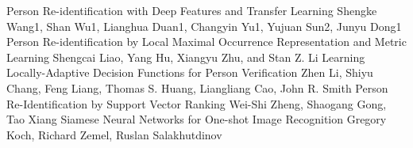 \documentclass{article}[12pt,a4paper]
\begin{document}
\newpage
\begin{thebibliography}{1}
    
 Person Re-identification with Deep Features and Transfer Learning
Shengke Wang1, Shan Wu1, Lianghua Duan1, Changyin Yu1, Yujuan Sun2, Junyu Dong1
 Person Re-identification by Local Maximal Occurrence
Representation and Metric Learning
Shengcai Liao, Yang Hu, Xiangyu Zhu, and Stan Z. Li
 Learning Locally-Adaptive Decision Functions for Person Verification
Zhen Li, Shiyu Chang, Feng Liang, Thomas S. Huang, Liangliang Cao, John R. Smith
 Person Re-Identification by Support Vector Ranking
Wei-Shi Zheng, Shaogang Gong, Tao Xiang
 Siamese Neural Networks for One-shot Image Recognition
Gregory Koch, Richard Zemel, Ruslan Salakhutdinov
\end{thebibliography}
\end{document}
